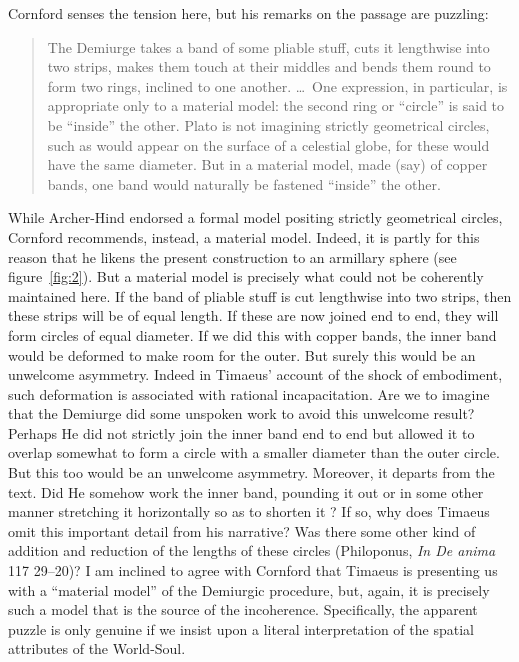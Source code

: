 Cornford senses the tension here, but his remarks on the passage are puzzling:
\begin{quote}
	The Demiurge takes a band of some pliable stuff, cuts it lengthwise into two strips, makes them touch at their middles and bends them round to form two rings, inclined to one another. \ldots\ One expression, in particular, is appropriate only to a material model: the second ring or ``circle'' is said to be ``inside'' the other. Plato is not imagining strictly geometrical circles, such as would appear on the surface of a celestial globe, for these would have the same diameter. But in a material model, made (say) of copper bands, one band would naturally be fastened ``inside'' the other. \citep[74]{Cornford:1935fk}
\end{quote}
While Archer-Hind endorsed a formal model positing strictly geometrical circles, Cornford recommends, instead, a material model. Indeed, it is partly for this reason that he likens the present construction to an armillary sphere (see figure~\ref{fig:2}). But a material model is precisely what could not be coherently maintained here. If the band of pliable stuff is cut lengthwise into two strips, then these strips will be of equal length. If these are now joined end to end, they will form circles of equal diameter. If we did this with copper bands, the inner band would be deformed to make room for the outer. But surely this would be an unwelcome asymmetry. Indeed in Timaeus' account of the shock of embodiment, such deformation is associated with rational incapacitation. Are we to imagine that the Demiurge did some unspoken work to avoid this unwelcome result? Perhaps He did not strictly join the inner band end to end but allowed it to overlap somewhat to form a circle with a smaller diameter than the outer circle. But this too would be an unwelcome asymmetry. Moreover, it departs from the text. Did He somehow work the inner band, pounding it out or in some other manner stretching it horizontally so as to shorten it \citep[119]{Dicks:1970aa}? If so, why does Timaeus omit this important detail from his narrative? Was there some other kind of addition and reduction of the lengths of these circles (Philoponus, \emph{In De anima} 117 29--20)? I am inclined to agree with Cornford that Timaeus is presenting us with a ``material model'' of the Demiurgic procedure, but, again, it is precisely such a model that is the source of the incoherence. Specifically, the apparent puzzle is only genuine if we insist upon a literal interpretation of the spatial attributes of the World-Soul.

